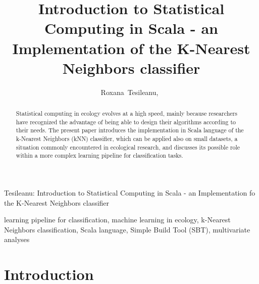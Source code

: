 \documentclass[journal]{IEEEtran}
\begin{document}
\title{Introduction to Statistical Computing in Scala - an Implementation of the K-Nearest Neighbors classifier}
\author{Roxana~Tesileanu,~}

{Tesileanu: Introduction to Statistical Computing in Scala - an Implementation fo the K-Nearest Neighbors classifier}

\maketitle

\begin{abstract}

Statistical computing in ecology evolves at a high speed, mainly because researchers have recognized the advantage of being able to design their algorithms according to their needs.
 The present paper introduces the implementation in Scala language of the k-Nearest Neighbors (kNN) classifier, which can be applied also on small datasets, a situation commonly encountered in ecological research, and discusses its possible role within a more complex learning pipeline for classification tasks. 

\end{abstract} 

\begin{IEEEkeywords}
learning pipeline for classification, machine learning in ecology, k-Nearest Neighbors classification, Scala language, Simple Build Tool (SBT), multivariate analyses 
\end{IEEEkeywords}

\section{Introduction}
\end{document}

